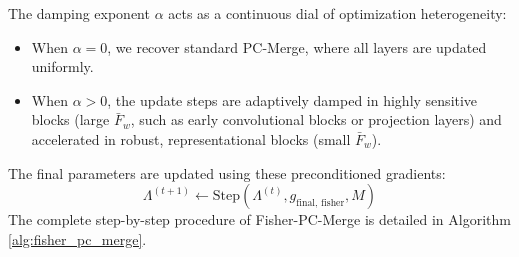 \documentclass{article}
\theoremstyle{plain}
\theoremstyle{definition}
\theoremstyle{remark}
\begin{document}
The damping exponent $\alpha$ acts as a continuous dial of optimization heterogeneity:
\begin{itemize}
    \item When $\alpha = 0$, we recover standard PC-Merge, where all layers are updated uniformly.
    \item When $\alpha > 0$, the update steps are adaptively damped in highly sensitive blocks (large $\bar{F}_w$, such as early convolutional blocks or projection layers) and accelerated in robust, representational blocks (small $\bar{F}_w$).
\end{itemize}
The final parameters are updated using these preconditioned gradients:
\begin{equation}
    \Lambda^{(t+1)} \leftarrow \text{Step}(\Lambda^{(t)}, g_{\text{final, fisher}}, M)
\end{equation}
The complete step-by-step procedure of Fisher-PC-Merge is detailed in Algorithm \ref{alg:fisher_pc_merge}.
\end{document}
